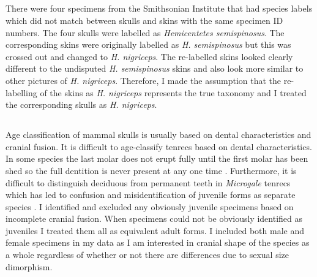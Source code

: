 \subsection{}
	
	There were four specimens from the Smithsonian Institute that had species labels which did not match between skulls and skins with the same specimen ID numbers. The four skulls were labelled as \textit{Hemicentetes semispinosus}. The corresponding skins were originally labelled as \textit{H. semispinosus} but this was crossed out and changed to \textit{H. nigriceps}. The re-labelled skins looked clearly different to the undisputed \textit{H. semispinosus} skins and also look more similar to other pictures of \textit{H. nigriceps}. Therefore, I made the assumption that the re-labelling of the skins as \textit{H. nigriceps} represents the true taxonomy and I treated the corresponding skulls as \textit{H. nigriceps}.

\subsection{}

	Age classification of mammal skulls is usually based on dental characteristics and cranial fusion.
 	It is difficult to age-classify tenrecs based on dental characteristics. In some species the last molar does not erupt fully until the first molar has been shed so the full dentition is never present at any one time \citep{Nowak1983}. Furthermore, it is difficult to distinguish deciduous from permanent teeth in \textit{Microgale} tenrecs \citep{Asher2008} which has led to confusion and misidentification of juvenile forms as separate species \citep{Olson2004}.
 	I identified and excluded any obviously juvenile specimens based on incomplete cranial fusion. When specimens could not be obviously identified as juveniles I treated them all as equivalent adult forms. 	
	I included both male and female specimens in my data as I am interested in cranial shape of the species as a whole regardless of whether or not there are differences due to sexual size dimorphism.


\subsection{}
	
